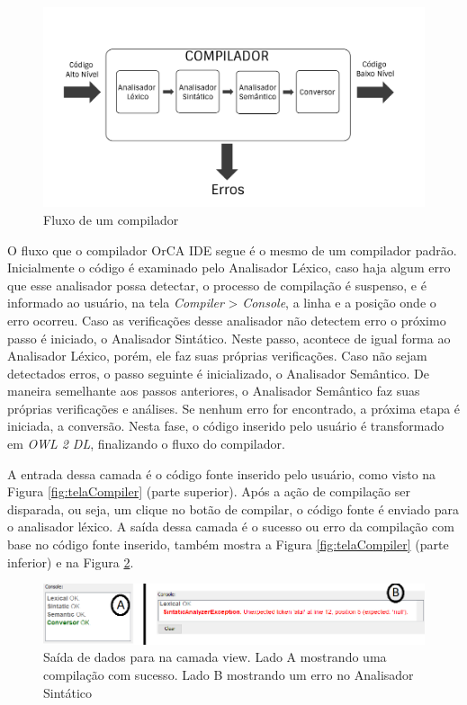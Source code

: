 \documentclass{bcc}
\begin{document}
\begin{figure}[H]
\centering
\includegraphics[width=.7\textwidth]{Figuras/compiladorscheme.png}
\caption{Fluxo de um compilador}
\label{fig:compilerscheme}
\end{figure}

O fluxo que o compilador OrCA IDE segue é o mesmo de um compilador padrão. Inicialmente o código é examinado pelo Analisador Léxico, caso haja algum erro que esse analisador possa detectar, o processo de compilação é suspenso, e é informado ao usuário, na tela \textit{Compiler} > \textit{Console}, a linha e a posição onde o erro ocorreu. Caso as verificações desse analisador não detectem erro o próximo passo é iniciado, o Analisador Sintático. Neste passo, acontece de igual forma ao Analisador Léxico, porém, ele faz suas próprias verificações. Caso não sejam detectados erros, o passo seguinte é inicializado, o Analisador Semântico. De maneira semelhante aos passos anteriores, o Analisador Semântico faz suas próprias verificações e análises. Se nenhum erro for encontrado, a próxima etapa é iniciada, a conversão. Nesta fase, o código inserido pelo usuário é transformado em \textit{OWL 2 DL}, finalizando o fluxo do compilador. 


\iffalse
A entrada dessa camada é o código fonte inserido pelo usuário, como visto na Figura \ref{fig:telaCompiler} (parte superior). Após a ação de compilação ser disparada, ou seja, um clique no botão de compilar, o código  fonte é enviado para o analisador léxico. A saída dessa camada é o sucesso ou erro da compilação com base no código fonte inserido, também mostra a Figura \ref{fig:telaCompiler} (parte inferior) e na Figura \ref{fig:telaCompilerSaida}.
\begin{figure}[H]
\centering
\includegraphics[width=.7\textwidth]{Figuras/tela_compiler_saida.png}
\caption{Saída de dados para na camada view. Lado A mostrando uma compilação com sucesso. Lado B mostrando um erro no Analisador Sintático}
\label{fig:telaCompilerSaida}
\end{figure}
\end{document}
